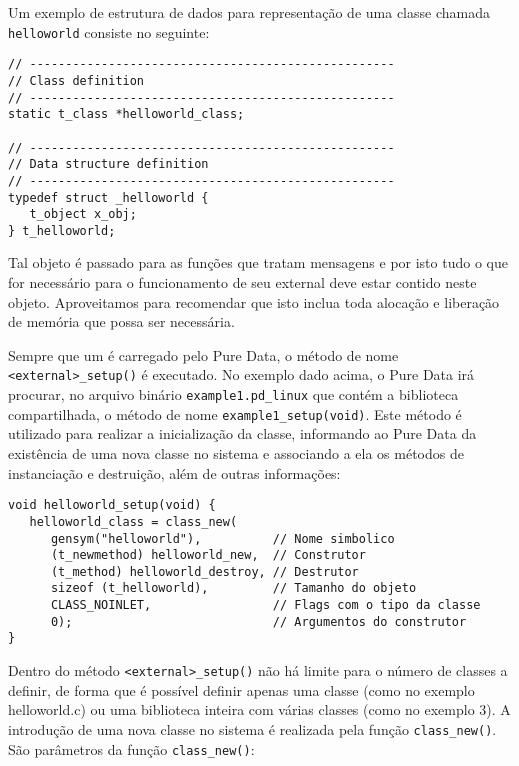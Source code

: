Um exemplo de estrutura de dados para representação de uma classe chamada
\texttt{helloworld} consiste no seguinte:

\vspace{1em}
\begin{lstlisting}[caption=Estruturas de dados de um \external]
// ---------------------------------------------------
// Class definition
// ---------------------------------------------------
static t_class *helloworld_class;

// ---------------------------------------------------
// Data structure definition
// ---------------------------------------------------
typedef struct _helloworld {
   t_object x_obj;
} t_helloworld;
\end{lstlisting}

Tal objeto é passado para as funções que tratam mensagens e por isto tudo o que
for necessário para o funcionamento de seu external deve estar contido neste
objeto.
Aproveitamos para recomendar que isto inclua toda alocação e liberação de
memória que possa ser necessária.

Sempre que um \external é carregado pelo Pure Data, o método de nome
\texttt{<external>\_setup()} é executado. No exemplo dado acima, o Pure
Data irá procurar, no arquivo binário \texttt{example1.pd\_linux} que contém
a biblioteca compartilhada, o método de nome \texttt{example1\_setup(void)}.
Este método é utilizado para realizar a inicialização da classe, informando ao
Pure Data da existência de uma nova classe no sistema e associando a ela os
métodos de instanciação e destruição, além de outras informações:

\vspace{1em}
\begin{lstlisting}[caption=Método setup]
void helloworld_setup(void) {
   helloworld_class = class_new(
      gensym("helloworld"),          // Nome simbolico
      (t_newmethod) helloworld_new,  // Construtor
      (t_method) helloworld_destroy, // Destrutor
      sizeof (t_helloworld),         // Tamanho do objeto
      CLASS_NOINLET,                 // Flags com o tipo da classe
      0);                            // Argumentos do construtor
}
\end{lstlisting}

Dentro do método \texttt{<external>\_setup()} não há limite para o número de
classes a definir, de forma que é possível definir apenas uma classe (como no
exemplo helloworld.c) ou uma biblioteca inteira com várias classes (como no exemplo 3).
A introdução de uma nova classe no sistema é realizada pela função
\texttt{class\_new()}.
São parâmetros da função \texttt{class\_new()}:

